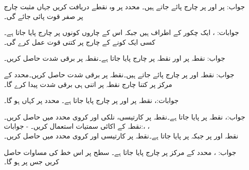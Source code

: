  جواب:
 پر  اور  پر  چارج پائے جاتے ہیں۔ محدد پر وہ نقطے دریافت کریں جہاں مثبت چارج پر صفر قوت پائی جائے گی۔

جوابات: ، 
ایک چکور کے اطراف  ہیں جبکہ اس کے چاروں کونوں پر  چارج پایا جاتا ہے۔کسی ایک کونے کے چارج پر کتنی قوت عمل کرے گی۔

جواب:
نقطہ  پر  اور نقطہ  پر  چارج پایا جاتا ہے۔نقطہ  پر برقی شدت  حاصل کریں۔

جواب:
نقطہ  اور  پر  چارج پائے جاتے ہیں۔نقطہ  پر برقی شدت  حاصل کریں۔محدد کے مرکز پر کتنا چارج نقطہ  پر اتنی ہی برقی شدت پیدا کرے گا۔

جوابات:، 
نقطہ  پر  اور  پر  چارج پایا جاتا ہے۔ محدد پر کہاں  ہو گا۔

جواب:، 
نقطہ  پر  پایا جاتا ہے۔نقطہ  پر کارتیسی، نلکی اور کروی  محدد میں  حاصل کریں۔نقطہ  کے اکائی سمتیات استعمال کریں۔
-
جوابات:، ، \\
نقطہ  اور  پر  جبکہ  پر  پایا جاتا ہے۔نقطہ  پر کارتیسی اور کروی محدد میں  حاصل کریں۔

جواب: ، 
محدد کے مرکز پر  چارج پایا جاتا ہے۔ سطح  پر اس خط کی مساوات حاصل کریں جس پر  ہو گا۔

